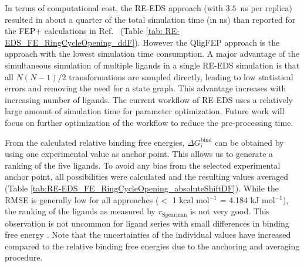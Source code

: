
In terms of computational cost, the RE-EDS approach (with $3.5$~ns per replica) resulted in about a quarter of the total simulation time (in ns) than reported for the FEP+ calculations in Ref.~\cite{Wang2017} (Table \ref{tab: RE-EDS_FE_RingCycleOpening_ddF}). However the QligFEP approach is the approach with the lowest simulation time consumption. A major advantage of the simultaneous simulation of multiple ligands in a single RE-EDS simulation is that all $N(N-1)/2$ transformations are sampled directly, leading to low statistical errors and removing the need for a state graph. This advantage increases with increasing number of ligands. The current workflow of RE-EDS uses a relatively large amount of simulation time for parameter optimization. Future work will focus on further optimization of the workflow to reduce the pre-processing time. 

From the calculated relative binding free energies, $\Delta G_{i}^{\text{bind}}$ can be obtained by using one experimental value as anchor point. This allows us to generate a ranking of the five ligands. To avoid any bias from the selected experimental anchor point, all possibilities were calculated and the resulting values averaged (Table \ref{tab:RE-EDS_FE_RingCycleOpening_absoluteShiftDF}). While the RMSE is generally low for all approaches ($<$ 1 kcal mol$^{-1}$ = 4.184 kJ mol$^{-1}$), the ranking of the ligands as measured by $r_{\text{Spearman}}$ is not very good. 
This observation is not uncommon for ligand series with small differences in binding free energy \cite{Wang2015,Schindler2020}.
Note that the uncertainties of the individual values have increased compared to the relative binding free energies due to the anchoring and averaging procedure.

